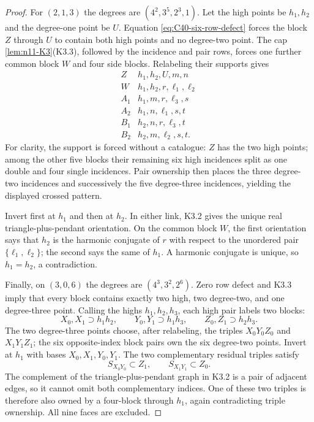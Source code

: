\begin{proof}
For $(2,1,3)$ the degrees are $(4^2,3^5,2^3,1)$.  Let the high points be
$h_1,h_2$ and the degree-one point be $U$.  Equation
\eqref{eq:C40-six-row-defect} forces the block $Z$ through $U$ to contain
both high points and no degree-two point.  The cap
\cref{lem:n11-K3}(K3.3), followed by the incidence and pair rows, forces
one further common block $W$ and four side blocks.  Relabeling their
supports gives
\begin{equation}
\begin{array}{c|l}
Z&h_1,h_2,U,m,n\\
W&h_1,h_2,r,\ell_1,\ell_2\\
A_1&h_1,m,r,\ell_3,s\\
A_2&h_1,n,\ell_1,s,t\\
B_1&h_2,n,r,\ell_3,t\\
B_2&h_2,m,\ell_2,s,t.
\end{array}\label{eq:C40-harmonic-skeleton}
\end{equation}
For clarity, the support is forced without a catalogue: $Z$ has the two
high points; among the other five blocks their remaining six high
incidences split as one double and four single incidences.  Pair ownership
then places the three degree-two incidences and successively the five
degree-three incidences, yielding the displayed crossed pattern.

Invert first at $h_1$ and then at $h_2$.  In either link, K3.2 gives the
unique real triangle-plus-pendant orientation.  On the common block $W$,
the first orientation says that $h_2$ is the harmonic conjugate of $r$
with respect to the unordered pair $\{\ell_1,\ell_2\}$; the second says the
same of $h_1$.  A harmonic conjugate is unique, so $h_1=h_2$, a
contradiction.

Finally, on $(3,0,6)$ the degrees are $(4^3,3^2,2^6)$.  Zero row defect and
K3.3 imply that every block contains exactly two high, two degree-two, and
one degree-three point.  Calling the highs $h_1,h_2,h_3$, each high pair
labels two blocks:
\[
 X_0,X_1\supset h_1h_2,\qquad
 Y_0,Y_1\supset h_1h_3,\qquad
 Z_0,Z_1\supset h_2h_3.
\]
The two degree-three points choose, after relabeling, the triples
$X_0Y_0Z_0$ and $X_1Y_1Z_1$; the six opposite-index block pairs own the six
degree-two points.  Invert at $h_1$ with bases $X_0,X_1,Y_0,Y_1$.  The two
complementary residual triples satisfy
\[
 S_{X_0Y_0}\subset Z_1,\qquad S_{X_1Y_1}\subset Z_0.
\]
The complement of the triangle-plus-pendant graph in K3.2 is a pair of
adjacent edges, so it cannot omit both complementary indices.  One of
these two triples is therefore also owned by a four-block through $h_1$,
again contradicting triple ownership.  All nine faces are excluded.
\end{proof}

